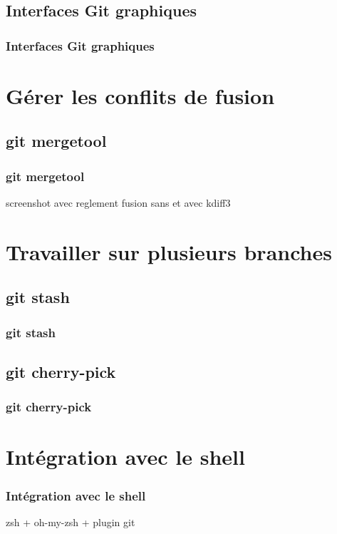 \documentclass[t,11pt]{beamer}
\begin{document}
\subsection{Interfaces Git graphiques}
\begin{frame}
        \frametitle{Interfaces Git graphiques}
\end{frame}


\section{G\'erer les conflits de fusion}
\subsection{git mergetool}
\begin{frame}
        \frametitle{git mergetool}
        screenshot avec reglement fusion
        sans et avec kdiff3
\end{frame}

\section{Travailler sur plusieurs branches}
\subsection{git stash}
\begin{frame}
        \frametitle{git stash}
\end{frame}

\subsection{git cherry-pick}
\begin{frame}
        \frametitle{git cherry-pick}
\end{frame}

\section{Int\'egration avec le shell}
\begin{frame}
        \frametitle{Int\'egration avec le shell}
        zsh + oh-my-zsh + plugin git
\end{frame}
\end{document}
